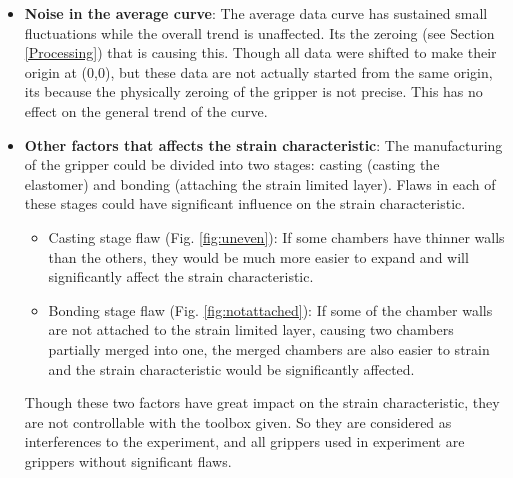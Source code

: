 \documentclass[conference]{IEEEtran}
\begin{document}
\begin{itemize}
    \item  \textbf{Noise in the average curve}: The average data curve has sustained small fluctuations while the overall trend is unaffected. Its the zeroing (see Section \ref{Processing}) that is causing this. Though all data were shifted to make their origin at (0,0), but these data are not actually started from the same origin, its because the physically zeroing of the gripper is not precise. This has no effect on the general trend of the curve.
    \item \textbf{Other factors that affects the strain characteristic}: The manufacturing of the gripper could be divided into two stages: casting (casting the elastomer) and bonding (attaching the strain limited layer). Flaws in each of these stages could have significant influence on the strain characteristic.
        \begin{itemize}
            \item Casting stage flaw (Fig. \ref{fig:uneven}): If some chambers have thinner walls than the others, they would be much more easier to expand and will significantly affect the strain characteristic.
            \item Bonding stage flaw (Fig. \ref{fig:notattached}): If some of the chamber walls are not attached to the strain limited layer, causing two chambers partially merged into one, the merged chambers are also easier to strain and the strain characteristic would be significantly affected.
        \end{itemize}
        Though these two factors have great impact on the strain characteristic, they are not controllable with the toolbox given. So they are considered as interferences to the experiment, and all grippers used in experiment are grippers without significant flaws.
\end{itemize}
\end{document}
